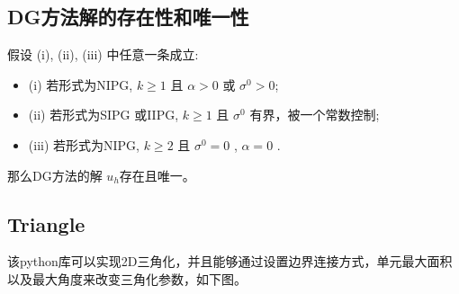 \cleardoublepage

{

    \appendixsubsecmajornumbering

}
\subsection*{DG方法解的存在性和唯一性}
假设 (i), (ii), (iii) 中任意一条成立:
\begin{itemize}
    \item (i) 若形式为NIPG,  $k \geq 1$  且  $\alpha>0$  或  $\sigma^{0}>0 $;
    \item (ii) 若形式为SIPG 或IIPG,  $k \geq 1$  且 $\sigma^{0}$ 有界，被一个常数控制;
    \item (iii) 若形式为NIPG,  $k \geq 2$  且  $\sigma^{0}=0$ , $\alpha=0$ .
\end{itemize}
那么DG方法的解  $u_{h}$存在且唯一。

\subsection*{Triangle}
该python库可以实现2D三角化，并且能够通过设置边界连接方式，单元最大面积以及最大角度来改变三角化参数，如下图。

